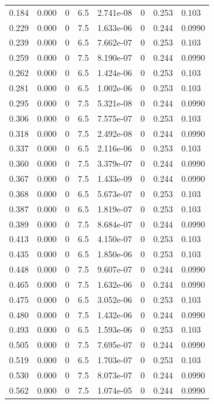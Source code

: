 \documentclass[preview]{standalone}
\begin{document}
{{\begin{tabular}{L{1.2cm}C{1.2cm} C{0.3cm}C{0.5cm} C{1.4cm}C{1.4cm} C{1.4cm}C{1.4cm}}
  0.184  &  0.000  & 0     & 6.5 &  2.741e-08  & 0  & 0.253 &  0.103   \\ 
  0.229  &  0.000  & 0     & 7.5 &  1.633e-06  & 0  & 0.244 &  0.0990   \\ 
  0.239  &  0.000  & 0     & 6.5 &  7.662e-07  & 0  & 0.253 &  0.103   \\ 
  0.259  &  0.000  & 0     & 7.5 &  8.190e-07  & 0  & 0.244 &  0.0990   \\ 
  0.262  &  0.000  & 0     & 6.5 &  1.424e-06  & 0  & 0.253 &  0.103   \\ 
  0.281  &  0.000  & 0     & 6.5 &  1.002e-06  & 0  & 0.253 &  0.103   \\ 
  0.295  &  0.000  & 0     & 7.5 &  5.321e-08  & 0  & 0.244 &  0.0990   \\ 
  0.306  &  0.000  & 0     & 6.5 &  7.575e-07  & 0  & 0.253 &  0.103   \\ 
  0.318  &  0.000  & 0     & 7.5 &  2.492e-08  & 0  & 0.244 &  0.0990   \\ 
  0.337  &  0.000  & 0     & 6.5 &  2.116e-06  & 0  & 0.253 &  0.103   \\ 
  0.360  &  0.000  & 0     & 7.5 &  3.379e-07  & 0  & 0.244 &  0.0990   \\ 
  0.367  &  0.000  & 0     & 7.5 &  1.433e-09  & 0  & 0.244 &  0.0990   \\ 
  0.368  &  0.000  & 0     & 6.5 &  5.673e-07  & 0  & 0.253 &  0.103   \\ 
  0.387  &  0.000  & 0     & 6.5 &  1.819e-07  & 0  & 0.253 &  0.103   \\ 
  0.389  &  0.000  & 0     & 7.5 &  8.684e-07  & 0  & 0.244 &  0.0990   \\ 
  0.413  &  0.000  & 0     & 6.5 &  4.150e-07  & 0  & 0.253 &  0.103   \\ 
  0.435  &  0.000  & 0     & 6.5 &  1.850e-06  & 0  & 0.253 &  0.103   \\ 
  0.448  &  0.000  & 0     & 7.5 &  9.607e-07  & 0  & 0.244 &  0.0990   \\ 
  0.465  &  0.000  & 0     & 7.5 &  1.632e-06  & 0  & 0.244 &  0.0990   \\ 
  0.475  &  0.000  & 0     & 6.5 &  3.052e-06  & 0  & 0.253 &  0.103   \\ 
  0.480  &  0.000  & 0     & 7.5 &  1.432e-06  & 0  & 0.244 &  0.0990   \\ 
  0.493  &  0.000  & 0     & 6.5 &  1.593e-06  & 0  & 0.253 &  0.103   \\ 
  0.505  &  0.000  & 0     & 7.5 &  7.695e-07  & 0  & 0.244 &  0.0990   \\ 
  0.519  &  0.000  & 0     & 6.5 &  1.703e-07  & 0  & 0.253 &  0.103   \\ 
  0.530  &  0.000  & 0     & 7.5 &  8.073e-07  & 0  & 0.244 &  0.0990   \\ 
  0.562  &  0.000  & 0     & 7.5 &  1.074e-05  & 0  & 0.244 &  0.0990   \\ 
\hline 
\end{tabular} 

}}
\end{document}
